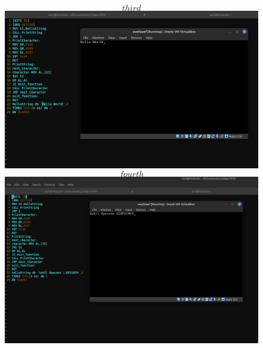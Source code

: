 \documentclass{article}
\begin{document}
\begin{figure}[htbp]
  \centering
    $$third$$
  \includegraphics[width=1\linewidth]{fig3.png}
    $$fourth$$
  \includegraphics[width=1\linewidth]{fig4.png}
\end{figure}

\begin{figure}[htbp]
\end{figure}
\end{document}
